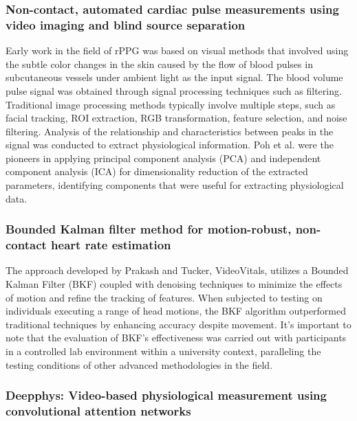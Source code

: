 \documentclass[a4paper]{article}
\begin{document}
\subsubsection{Non-contact, automated cardiac pulse measurements using video imaging and blind source separation}
Early work in the field of rPPG was based on visual methods that involved using the subtle color changes in the skin caused by the flow of blood pulses in subcutaneous vessels under ambient light as the input signal. The blood volume pulse signal was obtained through signal processing techniques such as filtering. Traditional image processing methods typically involve multiple steps, such as facial tracking, ROI extraction, RGB transformation, feature selection, and noise filtering. Analysis of the relationship and characteristics between peaks in the signal was conducted to extract physiological information. Poh et al. were the pioneers in applying principal component analysis (PCA) and independent component analysis (ICA) for dimensionality reduction of the extracted parameters, identifying components that were useful for extracting physiological data\cite{poh2010non}. 

\subsubsection{Bounded Kalman filter method for motion-robust, non-contact heart rate estimation}
The approach developed by Prakash and Tucker, VideoVitals, utilizes a Bounded Kalman Filter (BKF) coupled with denoising techniques to minimize the effects of motion and refine the tracking of features. When subjected to testing on individuals executing a range of head motions, the BKF algorithm outperformed traditional techniques by enhancing accuracy despite movement. It's important to note that the evaluation of BKF's effectiveness was carried out with participants in a controlled lab environment within a university context, paralleling the testing conditions of other advanced methodologies in the field\cite{prakash2018bounded}.

\subsubsection{Deepphys: Video-based physiological measurement using convolutional attention networks}
\end{document}
